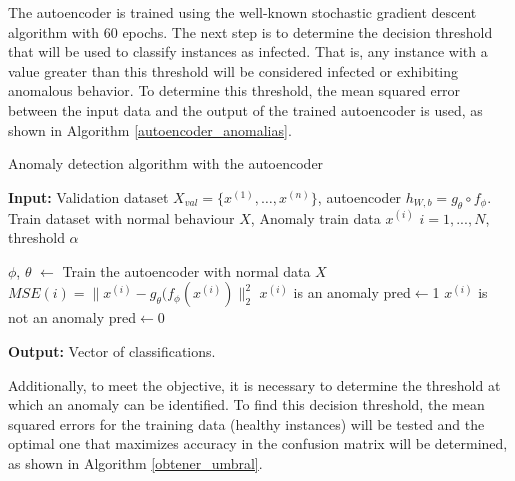 \documentclass{iosart2c}
\begin{document}
The autoencoder is trained using the well-known stochastic gradient descent algorithm with 60 epochs. The next step is to determine the decision threshold that will be used to classify instances as infected. That is, any instance with a value greater than this threshold will be considered infected or exhibiting anomalous behavior. To determine this threshold, the mean squared error between the input data and the output of the trained autoencoder is used, as shown in Algorithm \ref{autoencoder_anomalias}.


\begin{algorithm}[h!]
\caption{Anomaly detection algorithm with the autoencoder}\label{autoencoder_anomalias}
\textbf{Input:} Validation dataset $X_{val}=\{x^{(1)},\ldots,x^{(n)}\}$, autoencoder $h_{W,b}=g_\theta \circ f_\phi$.\\ Train dataset with normal behaviour  $X$, Anomaly train data $x^{(i)}$ $i = 1,...,N$, threshold $\alpha$\\
\begin{algorithmic}[1]
\State $\phi$, $\theta$ $\xleftarrow{}$ Train the autoencoder with normal data $X$
    \State $MSE(i) = \lVert x^{(i)} - g_\theta(f_\phi(x^{(i)})\rVert_2^2$ 
        \State$x^{(i)}$ is an anomaly
        \State pred$\xleftarrow{}$1
    \Else 
        \State$x^{(i)}$ is not an anomaly
        \State pred$\xleftarrow{}$0
    \EndIf
\EndFor
\end{algorithmic}
\textbf{Output:} Vector of classifications.\\
\end{algorithm}


Additionally, to meet the objective, it is necessary to determine the threshold at which an anomaly can be identified. To find this decision threshold, the mean squared errors for the training data (healthy instances) will be tested and the optimal one that maximizes accuracy in the confusion matrix will be determined, as shown in Algorithm \ref{obtener_umbral}.
\end{document}
